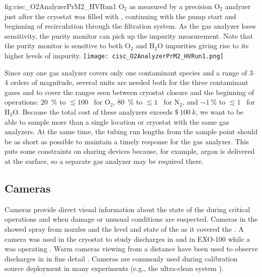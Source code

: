 \begin{dunefigure}{fig:cisc_O2AnalyzerPrM2_HVRun1}
  {$\text{O}_2$ as measured by a precision $\text{O}_2$ analyzer just after the  cryostat was filled with , continuing with the  pump start and beginning of  recirculation through the filtration system. As the gas analyzer loses sensitivity, the purity monitor can pick up the impurity measurement. Note that the purity monitor is sensitive to both $\text{O}_2$ and $\text{H}_2\text{O}$ impurities giving rise to its higher levels of impurity.}
  \texttt{[image: cisc\_O2AnalyzerPrM2\_HVRun1.png]}
\end{dunefigure}

Since any one gas analyzer covers only one contaminant species and a range of \numrange{3}{4} orders of magnitude, several units are needed both for the three contaminant gases and to cover the ranges seen between  cryostat closure and the beginning of  operations:
\SI{20}{\percent} to $\lesssim 100$~ for $\text{O}_2$,
\SI{80}{\percent} to $\lesssim 1$~ for $\text{N}_2$, and
$\sim \SI{1}{\percent}$ to $\lesssim 1$~ for $\text{H}_2\text{O}$.
Because the total cost of these analyzers exceeds $\SI{100}[\mathdollar]{k}$, we want to be able to  sample more than a single location or cryostat with the same gas analyzers. At the same time, the tubing run lengths from the sample point should be as short as possible to maintain a timely response for the gas analyzer.  This puts some constraints on sharing devices because, for example, argon is delivered at the surface, so a separate gas analyzer may be required there. %


\subsection{Cameras}

Cameras provide direct visual information about the state of the
 during critical operations and when damage or unusual
conditions are suspected.  Cameras in the  showed spray from \cooldown
nozzles and the level and state of the  as it covered the  \cite{Murphy:20170516}.  A camera was
used in the  
cryostat\cite{Adamowski:2014daa} to study  discharges in
 and in EXO-100 while a  was operating
\cite{Delaquis:2013hva}.  Warm cameras viewing  from a distance
have been used to observe  discharges in  in
fine detail \cite{Auger:2015xlo}.  Cameras are commonly used during
calibration source deployment in many experiments (e.g., the
\kamland ultra-clean system \cite{Banks:2014hra}).

